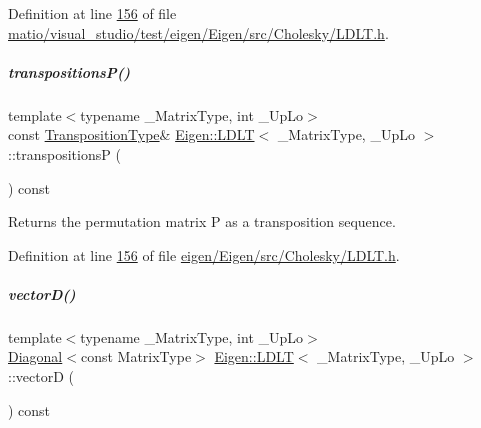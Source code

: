Definition at line \hyperlink{matio_2visual__studio_2test_2eigen_2_eigen_2src_2_cholesky_2_l_d_l_t_8h_source_l00156}{156} of file \hyperlink{matio_2visual__studio_2test_2eigen_2_eigen_2src_2_cholesky_2_l_d_l_t_8h_source}{matio/visual\+\_\+studio/test/eigen/\+Eigen/src/\+Cholesky/\+L\+D\+L\+T.\+h}.

\mbox{\label{group___cholesky___module_a47257d3500f9f7c9a4478158d0e34941}} 
\subparagraph{\texorpdfstring{transpositions\+P()}{transpositionsP()}\hspace{0.1cm}{\footnotesize\ttfamily [2/2]}}
{\footnotesize\ttfamily template$<$typename \+\_\+\+Matrix\+Type, int \+\_\+\+Up\+Lo$>$ \\
const \hyperlink{group___core___module}{Transposition\+Type}\& \hyperlink{group___cholesky___module_class_eigen_1_1_l_d_l_t}{Eigen\+::\+L\+D\+LT}$<$ \+\_\+\+Matrix\+Type, \+\_\+\+Up\+Lo $>$\+::transpositionsP (\begin{DoxyParamCaption}{ }\end{DoxyParamCaption}) const\hspace{0.3cm}{\ttfamily [inline]}}

\begin{DoxyReturn}{Returns}
the permutation matrix P as a transposition sequence. 
\end{DoxyReturn}


Definition at line \hyperlink{eigen_2_eigen_2src_2_cholesky_2_l_d_l_t_8h_source_l00156}{156} of file \hyperlink{eigen_2_eigen_2src_2_cholesky_2_l_d_l_t_8h_source}{eigen/\+Eigen/src/\+Cholesky/\+L\+D\+L\+T.\+h}.

\mbox{\label{group___cholesky___module_af60b2f826a38a00070e0efccf0572066}} 
\subparagraph{\texorpdfstring{vector\+D()}{vectorD()}\hspace{0.1cm}{\footnotesize\ttfamily [1/2]}}
{\footnotesize\ttfamily template$<$typename \+\_\+\+Matrix\+Type, int \+\_\+\+Up\+Lo$>$ \\
\hyperlink{group___core___module_class_eigen_1_1_diagonal}{Diagonal}$<$const Matrix\+Type$>$ \hyperlink{group___cholesky___module_class_eigen_1_1_l_d_l_t}{Eigen\+::\+L\+D\+LT}$<$ \+\_\+\+Matrix\+Type, \+\_\+\+Up\+Lo $>$\+::vectorD (\begin{DoxyParamCaption}{ }\end{DoxyParamCaption}) const\hspace{0.3cm}{\ttfamily [inline]}}

